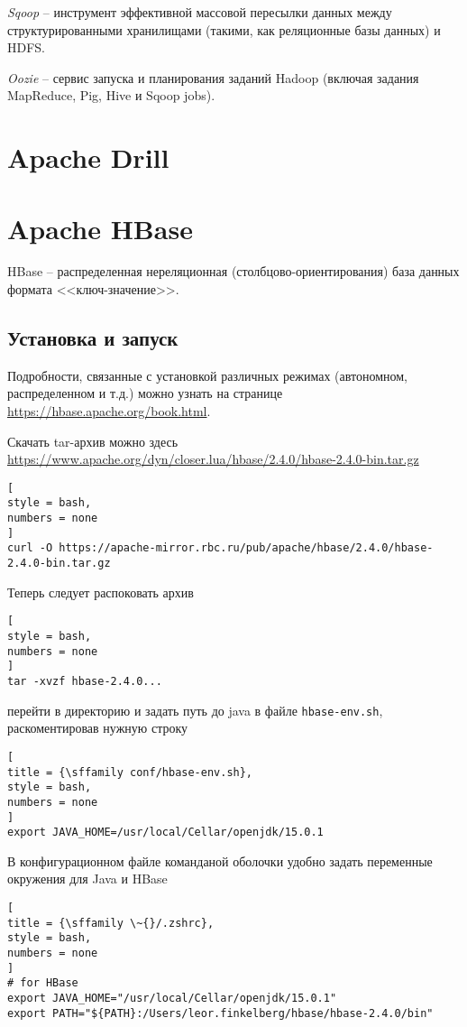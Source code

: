 \documentclass[%
	11pt,
	a4paper,
	utf8,
		]{article}
\begin{document}
\emph{Sqoop} -- инструмент эффективной массовой пересылки данных между структурированными хранилищами (такими, как реляционные базы данных) и HDFS.

\emph{Oozie} -- сервис запуска и планирования заданий Hadoop (включая задания MapReduce, Pig, Hive и Sqoop jobs).

\section{Apache Drill}

\section{Apache HBase}

HBase -- распределенная нереляционная (столбцово-ориентирования) база данных формата <<ключ-значение>>. 

\subsection{Установка и запуск}

Подробности, связанные с установкой различных режимах (автономном, распределенном и т.д.) можно узнать на странице \url{https://hbase.apache.org/book.html}.

Скачать tar-архив можно здесь \url{https://www.apache.org/dyn/closer.lua/hbase/2.4.0/hbase-2.4.0-bin.tar.gz}
\begin{lstlisting}[
style = bash,
numbers = none	
]
curl -O https://apache-mirror.rbc.ru/pub/apache/hbase/2.4.0/hbase-2.4.0-bin.tar.gz
\end{lstlisting}

Теперь следует распоковать архив
\begin{lstlisting}[
style = bash,
numbers = none	
]
tar -xvzf hbase-2.4.0...
\end{lstlisting}
перейти в директорию  и задать путь до java в файле \texttt{hbase-env.sh}, раскоментировав нужную строку
\begin{lstlisting}[
title = {\sffamily conf/hbase-env.sh},
style = bash,
numbers = none	
]
export JAVA_HOME=/usr/local/Cellar/openjdk/15.0.1
\end{lstlisting}

В конфигурационном файле команданой оболочки удобно задать переменные окружения для Java и HBase
\begin{lstlisting}[
title = {\sffamily \~{}/.zshrc},
style = bash,
numbers = none	
]
# for HBase
export JAVA_HOME="/usr/local/Cellar/openjdk/15.0.1"
export PATH="${PATH}:/Users/leor.finkelberg/hbase/hbase-2.4.0/bin"
\end{lstlisting}
\end{document}
